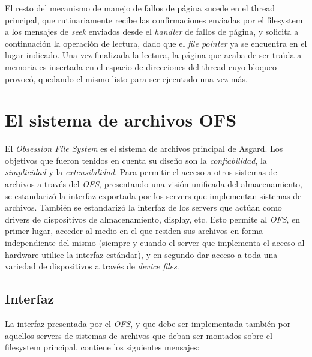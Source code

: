\documentclass[11pt, letterpaper, twoside]{book}
\begin{document}
El resto del mecanismo de manejo de fallos de p\'agina sucede en el thread principal, que rutinariamente recibe las confirmaciones enviadas por el filesystem a los mensajes de \emph{seek} enviados desde el \emph{handler} de fallos de p\'agina, y solicita a continuaci\'on la operaci\'on de lectura, dado que el \emph{file pointer} ya se encuentra en el lugar indicado. Una vez finalizada la lectura, la p\'agina que acaba de ser tra\'\i{}da a memoria es insertada en el espacio de direcciones del thread cuyo bloqueo provoc\'o, quedando el mismo listo para ser ejecutado una vez m\'as.

\chapter{El sistema de archivos OFS}

El \emph{Obsession File System} es el sistema de archivos principal de Asgard. Los objetivos que fueron tenidos en cuenta su dise\~no son la \emph{confiabilidad}, la \emph{simplicidad} y la \emph{extensibilidad}. Para permitir el acceso a otros sistemas de archivos a trav\'es del \emph{OFS}, presentando una visi\'on unificada del almacenamiento, se estandariz\'o la interfaz exportada por los servers que implementan sistemas de archivos. Tambi\'en se estandariz\'o la interfaz de los servers que act\'uan como drivers de dispositivos de almacenamiento, display, etc. Esto permite al \emph{OFS}, en primer lugar, acceder al medio en el que residen sus archivos en forma independiente del mismo (siempre y cuando el server que implementa el acceso al hardware utilice la interfaz est\'andar), y en segundo dar acceso a toda una variedad de dispositivos a trav\'es de \emph{device files}.

\section{Interfaz}

La interfaz presentada por el \emph{OFS}, y que debe ser implementada tambi\'en por aquellos servers de sistemas de archivos que deban ser montados sobre el filesystem principal, contiene los siguientes mensajes:
\end{document}

